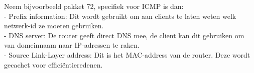 Neem bijvoorbeeld pakket 72, specifiek voor ICMP is dan:\\
- Prefix information: Dit wordt gebruikt om aan clients te laten weten welk netwerk-id ze moeten gebruiken.\\

- DNS server: De router geeft direct DNS mee, de client kan dit gebruiken om van domeinnaam naar IP-adressen te raken.\\

- Source Link-Layer address: Dit is het MAC-address van de router. Deze wordt gecachet voor efficiëntieredenen.